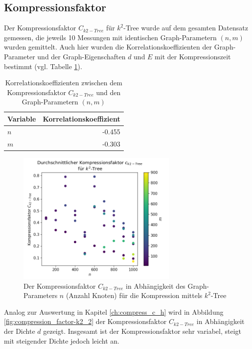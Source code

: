 \documentclass{ffhsthesis}
\begin{document}
\subsection{Kompressionsfaktor}
Der Kompressionsfaktor $C_{k2-Tree}$ für $k^{2}$-Tree wurde auf dem gesamten Datensatz gemessen, die jeweils 10 Messungen mit identischen Graph-Parametern $(n,m)$ wurden gemittelt. Auch hier wurden die Korrelationskoeffizienten der Graph-Parameter und der Graph-Eigenschaften $d$ und $E$ mit der Kompressionszeit bestimmt (vgl. Tabelle \ref{tab:coefficientstree2}).

\begin{table}[h]
\centering
\begin{tabular}{@{}lr@{}}
\toprule
Variable    & Korrelationskoeffizient \\
\midrule
$n$ & -0.455 \\
$m$ & -0.303 \\
\bottomrule
\end{tabular}
\caption{Korrelationskoeffizienten zwischen dem Kompressionsfaktor $C_{k2-Tree}$ und den Graph-Parametern $(n,m)$}
\label{tab:coefficientstree2}
\end{table}

\begin{figure}[H]
    \centering
    \includegraphics[width=0.7\textwidth]{images/avg_k2tree_compression_n_value_no_outliers_color.png}
    \caption{Der Kompressionsfaktor $C_{k2-Tree}$ in Abhängigkeit des Graph-Parameters $n$ (Anzahl Knoten) für die Kompression mittels $k^2$-Tree}
    \label{fig:compression_factor-k2}
\end{figure}

Analog zur Auswertung in Kapitel \ref{ch:compress_c_h} wird in Abbildung \ref{fig:compression_factor-k2_2} der Kompressionsfaktor $C_{k2-Tree}$ in Abhängigkeit der Dichte $d$ gezeigt. Insgesamt ist der Kompressionsfaktor sehr variabel, steigt mit steigender Dichte jedoch leicht an.
\end{document}
